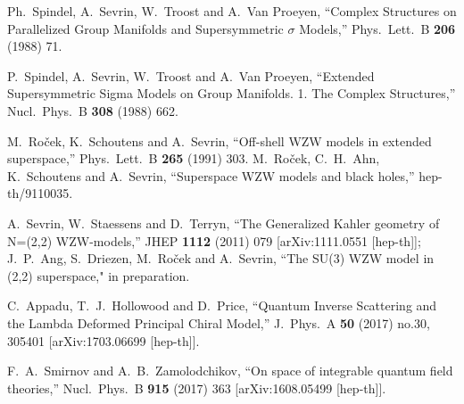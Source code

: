 \documentclass[12pt]{article}
\begin{document}
\begin{thebibliography}{99}
{  %
  Ph.~Spindel, A.~Sevrin, W.~Troost and A.~Van Proeyen,
  ``Complex Structures on Parallelized Group Manifolds and Supersymmetric $\sigma$ Models,''
  Phys.\ Lett.\ B {\bf 206} (1988) 71.

  P.~Spindel, A.~Sevrin, W.~Troost and A.~Van Proeyen,
  ``Extended Supersymmetric Sigma Models on Group Manifolds. 1. The Complex Structures,''
  Nucl.\ Phys.\ B {\bf 308} (1988) 662.


  M.~Ro\v cek, K.~Schoutens and A.~Sevrin,
  ``Off-shell WZW models in extended superspace,''
  Phys.\ Lett.\ B {\bf 265} (1991) 303.
  M.~Ro\v cek, C.~H.~Ahn, K.~Schoutens and A.~Sevrin,
  ``Superspace WZW models and black holes,''
  hep-th/9110035.
  
  A.~Sevrin, W.~Staessens and D.~Terryn,
  ``The Generalized Kahler geometry of N=(2,2) WZW-models,''
  JHEP {\bf 1112} (2011) 079
  [arXiv:1111.0551 [hep-th]];
J.~P.~Ang, S.~Driezen, M.~Ro\v cek and A.~Sevrin, ``The SU(3) WZW model in (2,2) superspace," in preparation.



  C.~Appadu, T.~J.~Hollowood and D.~Price,
  ``Quantum Inverse Scattering and the Lambda Deformed Principal Chiral Model,''
  J.\ Phys.\ A {\bf 50} (2017) no.30,  305401
  [arXiv:1703.06699 [hep-th]].
  
  
  F.~A.~Smirnov and A.~B.~Zamolodchikov,
  ``On space of integrable quantum field theories,''
  Nucl.\ Phys.\ B {\bf 915} (2017) 363
  [arXiv:1608.05499 [hep-th]].

}
\end{thebibliography}
\end{document}
